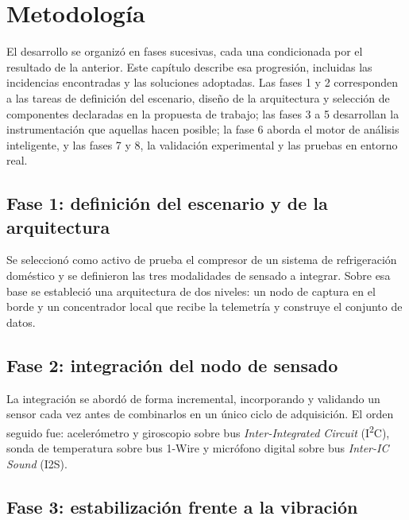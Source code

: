 \chapter{Metodología}
\label{cap:metodologia}

El desarrollo se organizó en fases sucesivas, cada una condicionada por el resultado de la
anterior. Este capítulo describe esa progresión, incluidas las incidencias encontradas y las
soluciones adoptadas. Las fases 1 y 2 corresponden a las tareas de definición del escenario,
diseño de la arquitectura y selección de componentes declaradas en la propuesta de trabajo; las
fases 3 a 5 desarrollan la instrumentación que aquellas hacen posible; la fase 6 aborda el motor de
análisis inteligente, y las fases 7 y 8, la validación experimental y las pruebas en entorno real.

\section{Fase 1: definición del escenario y de la arquitectura}

Se seleccionó como activo de prueba el compresor de un sistema de refrigeración doméstico y
se definieron las tres modalidades de sensado a integrar. Sobre esa base se estableció una
arquitectura de dos niveles: un nodo de captura en el borde y un concentrador local que
recibe la telemetría y construye el conjunto de datos.

\section{Fase 2: integración del nodo de sensado}

La integración se abordó de forma incremental, incorporando y validando un sensor cada vez
antes de combinarlos en un único ciclo de adquisición. El orden seguido fue: acelerómetro y
giroscopio sobre bus \textit{Inter-Integrated Circuit} (I\textsuperscript{2}C), sonda de
temperatura sobre bus 1-Wire y micrófono digital sobre bus \textit{Inter-IC Sound} (I2S).

\section{Fase 3: estabilización frente a la vibración}

